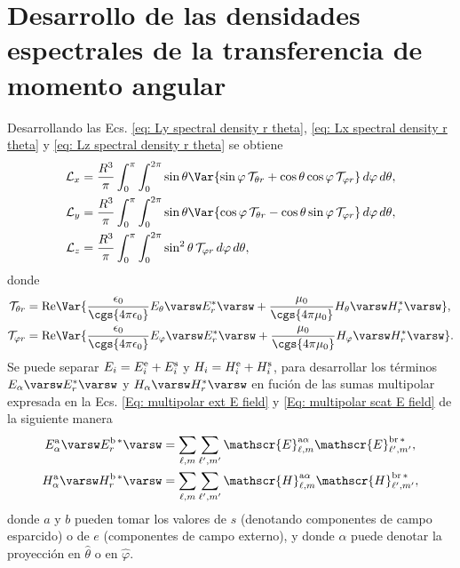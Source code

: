 \section{Desarrollo de las densidades espectrales de la transferencia de momento angular}
Desarrollando las Ecs. \eqref{eq: Ly spectral density r theta}, \eqref{eq: Lx spectral density r theta} y \eqref{eq: Lz spectral density r theta} se obtiene
%
\begin{align}
\mathcal{L}_x &= \frac{R^3}{\pi}\int_0^{\pi}\int_0^{2\pi} \sin\theta \Var{\sin\varphi \,\mathcal{T}_{\theta r} + \cos\theta\cos\varphi\,\mathcal{T}_{\varphi r}} \,d\varphi \, d\theta, \label{eq: Lx spectral integral angles}\\
\mathcal{L}_y &= \frac{R^3}{\pi}\int_0^{\pi}\int_0^{2\pi} \sin\theta \Var{\cos\varphi \,\mathcal{T}_{\theta r} - \cos\theta\sin\varphi\,\mathcal{T}_{\varphi r}} \,d\varphi \, d\theta, \label{eq: Ly spectral integral angles}\\
\mathcal{L}_z &= \frac{R^3}{\pi}\int_0^{\pi}\int_0^{2\pi} \sin^{2}\theta \, \mathcal{T}_{\varphi r} \,d\varphi \, d\theta, \label{eq: Lz spectral integral angles}
\end{align}
% 
donde 
\begin{align}
\mathcal{T}_{\theta r} &= {\rm Re}\Var{\frac{\epsilon_0}{\cgs{4\pi\epsilon_0}} E_{\theta}\varsw E_{r}^{*}\varsw + \frac{\mu_0}{\cgs{4\pi\mu_0}} H_{\theta}\varsw H_{r}^{*}\varsw  },\\
\mathcal{T}_{\varphi r} &= {\rm Re}\Var{\frac{\epsilon_0}{\cgs{4\pi\epsilon_0}} E_{\varphi}\varsw E_{r}^{*}\varsw + \frac{\mu_0}{\cgs{4\pi\mu_0}} H_{\varphi}\varsw H_{r}^{*}\varsw  }.
\end{align}
%
Se puede separar $E_i=E_i^{\rm e}+E_i^{\rm s}$ y $H_i=H_i^{\rm e}+H_i^{\rm s}$, para desarrollar los términos $E_{\alpha}\varsw E_{r}^{*}\varsw$ y $H_{\alpha}\varsw H_{r}^{*}\varsw$ en fución de las sumas multipolar expresada en la Ecs. \eqref{Eq: multipolar ext E field} y \eqref{Eq: multipolar scat E field} de la siguiente manera
\begin{align}
E^{\rm a}_{\alpha}\varsw E_{r}^{\rm b \,*}\varsw &= \sum_{\ell, m} \sum_{\ell^{\prime}, m^{\prime}} \mathscr{E}_{\ell, m}^{\text{a}\alpha}\mathscr{E}_{\ell^{\prime}, m^{\prime}}^{\text{br}\,*},\label{eq: cross terms E field}\\
H^{\rm a}_{\alpha}\varsw H_{r}^{\rm b \,*}\varsw &= \sum_{\ell, m} \sum_{\ell^{\prime}, m^{\prime}} \mathscr{H}_{\ell, m}^{\text{a}\alpha}\mathscr{H}_{\ell^{\prime}, m^{\prime}}^{\text{br}\,*},\label{eq: cross terms H field}
\end{align}
donde $a$ y $b$ pueden tomar los valores de $s$ (denotando componentes de campo esparcido) o de $e$ (componentes de campo externo), y donde $\alpha$ puede denotar la proyección en $\hat{ \theta}$ o en $\hat{\varphi}$. 

